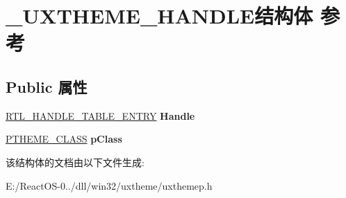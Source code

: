 \hypertarget{struct___u_x_t_h_e_m_e___h_a_n_d_l_e}{}\section{\+\_\+\+U\+X\+T\+H\+E\+M\+E\+\_\+\+H\+A\+N\+D\+L\+E结构体 参考}
\label{struct___u_x_t_h_e_m_e___h_a_n_d_l_e}
\subsection*{Public 属性}
\begin{DoxyCompactItemize}
\item 
\mbox{\label{struct___u_x_t_h_e_m_e___h_a_n_d_l_e_a7798c5d42abc5db8911997f7f9c824f1}} 
\hyperlink{struct___r_t_l___h_a_n_d_l_e___t_a_b_l_e___e_n_t_r_y}{R\+T\+L\+\_\+\+H\+A\+N\+D\+L\+E\+\_\+\+T\+A\+B\+L\+E\+\_\+\+E\+N\+T\+RY} {\bfseries Handle}
\item 
\mbox{\label{struct___u_x_t_h_e_m_e___h_a_n_d_l_e_aa4865f3178b40bc0d4b70bf49ed2feb6}} 
\hyperlink{struct___t_h_e_m_e___c_l_a_s_s}{P\+T\+H\+E\+M\+E\+\_\+\+C\+L\+A\+SS} {\bfseries p\+Class}
\end{DoxyCompactItemize}


该结构体的文档由以下文件生成\+:\begin{DoxyCompactItemize}
\item 
E\+:/\+React\+O\+S-\/0../dll/win32/uxtheme/uxthemep.\+h\end{DoxyCompactItemize}
